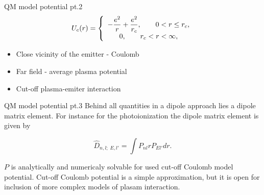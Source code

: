 \documentclass{beamer}
\begin{document}
\begin{frame}{QM model potential pt.2}
\centering
        $$
        \label{eq:U0} U_{c}(r) = \left\{
        \begin{array}{c c}
        - \displaystyle \frac{e^2}{r} + \displaystyle \frac{e^2}{r_c},
        \qquad            0 < r \le r_{c},
        \\
        \displaystyle 0 ,              \qquad      r_{c} < r < \infty,
        \end{array}
        \right.
        $$
        
    \begin{itemize}
     \item Close vicinity of the emitter - Coulomb
     \item Far field - average plasma potential
     \item Cut-off plasma-emiter interaction
    \end{itemize}

\end{frame}


\begin{frame}{QM model potential pt.3}
    Behind all quantities in a dipole approach lies a dipole matrix element. For instance for the photoionization the dipole matrix element is given by 
    
    $$
    \hat{D}_{n,l;\;E,l'} = \displaystyle \int P_{nl} r P_{El'} dr.
    $$

    $P$ is analytically and numericaly solvable for used cut-off Coulomb model potential. Cut-off Coulomb potential is a simple approximation, but it is open for inclusion of more complex models of plasam interaction.
\end{frame}
\end{document}
